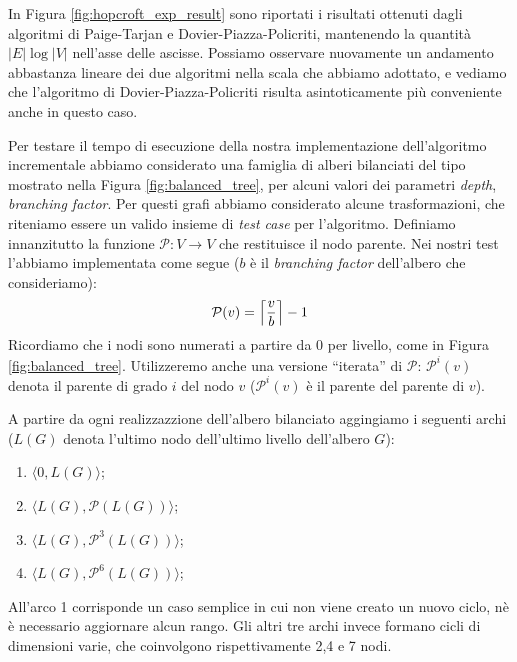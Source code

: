In Figura \ref{fig:hopcroft_exp_result} sono riportati i risultati ottenuti dagli algoritmi di Paige-Tarjan e Dovier-Piazza-Policriti, mantenendo la quantità $|E| \log |V|$ nell'asse delle ascisse. Possiamo osservare nuovamente un andamento abbastanza lineare dei due algoritmi nella scala che abbiamo adottato, e vediamo che l'algoritmo di Dovier-Piazza-Policriti risulta asintoticamente più conveniente anche in questo caso.

Per testare il tempo di esecuzione della nostra implementazione dell'algoritmo incrementale abbiamo considerato una famiglia di alberi bilanciati del tipo mostrato nella Figura \ref{fig:balanced_tree}, per alcuni valori dei parametri \emph{depth}, \emph{branching factor}. Per questi grafi abbiamo considerato alcune trasformazioni, che riteniamo essere un valido insieme di \emph{test case} per l'algoritmo. Definiamo innanzitutto la funzione $\mathcal{P} : V \to V$ che restituisce il nodo parente. Nei nostri test l'abbiamo implementata come segue ($b$ è il \emph{branching factor} dell'albero che consideriamo):
\begin{gather*}
    \mathcal{P}(v) = \ceil[\Big]{\frac{v}{b}} - 1
\end{gather*}
Ricordiamo che i nodi sono numerati a partire da 0 per livello, come in Figura \ref{fig:balanced_tree}. Utilizzeremo anche una versione ``iterata'' di $\mathcal{P}$: $\mathcal{P}^i(v)$ denota il parente di grado $i$ del nodo $v$ ($\mathcal{P}^i(v)$ è il parente del parente di $v$).

A partire da ogni realizzazzione dell'albero bilanciato aggingiamo i seguenti archi ($L(G)$ denota l'ultimo nodo dell'ultimo livello dell'albero $G$):
\begin{enumerate}
    \item $\langle 0, L(G)\rangle$;
    \item $\langle L(G), \mathcal{P}(L(G))\rangle$;
    \item $\langle L(G), \mathcal{P}^3(L(G))\rangle$;
    \item $\langle L(G), \mathcal{P}^6(L(G))\rangle$;
\end{enumerate}
All'arco 1 corrisponde un caso semplice in cui non viene creato un nuovo ciclo, nè è necessario aggiornare alcun rango. Gli altri tre archi invece formano cicli di dimensioni varie, che coinvolgono rispettivamente 2,4 e 7 nodi.

